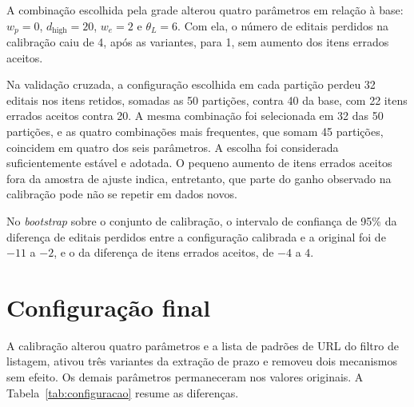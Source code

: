A combinação escolhida pela grade alterou quatro parâmetros em relação à base:
$w_p = 0$, $d_{\mathrm{high}} = 20$, $w_e = 2$ e $\theta_L = 6$. Com ela, o
número de editais perdidos na calibração caiu de 4, após as variantes, para 1,
sem aumento dos itens errados aceitos.

Na validação cruzada, a configuração escolhida em cada partição perdeu 32
editais nos itens retidos, somadas as 50 partições, contra 40 da base, com 22
itens errados aceitos contra 20. A mesma combinação foi selecionada em 32 das
50 partições, e as quatro combinações mais frequentes, que somam 45 partições,
coincidem em quatro dos seis parâmetros. A escolha foi considerada
suficientemente estável e adotada. O pequeno aumento de itens errados aceitos
fora da amostra de ajuste indica, entretanto, que parte do ganho observado na
calibração pode não se repetir em dados novos.

No \textit{bootstrap} sobre o conjunto de calibração, o intervalo de confiança
de 95\% da diferença de editais perdidos entre a configuração calibrada e a
original foi de $-11$ a $-2$, e o da diferença de itens errados aceitos, de
$-4$ a $4$.

\section{Configuração final}
\label{sec:configuracao}

A calibração alterou quatro parâmetros e a lista de padrões de URL do filtro de
listagem, ativou três variantes da extração de prazo e removeu dois mecanismos
sem efeito. Os demais parâmetros permaneceram nos valores originais. A
Tabela~\ref{tab:configuracao} resume as diferenças.

